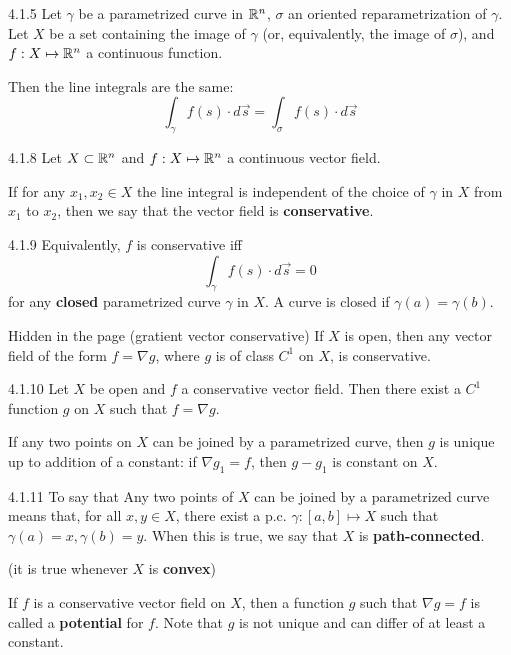 \begin{proposition}{4.1.5}
    Let $\gamma$ be a parametrized curve in $\mathbb{R}^n$, $\sigma$ an oriented reparametrization of $\gamma$.
    Let $X$ be a set containing the image of $\gamma$ (or, equivalently, the image of $\sigma$),
    and $f: X \mapsto \mathbb{R}^n$ a continuous function.

    Then the line integrals are the same:
    \[ \int_\gamma f(s) \cdot d \vec{s} = \int_\sigma f(s) \cdot d \vec{s} \]
\end{proposition}

\begin{definition}{4.1.8}
    Let $X \subset \mathbb{R}^n$ and $f: X \mapsto \mathbb{R}^n$ a continuous vector field.

    If for any $x_1, x_2 \in X$ the line integral is independent of the choice of $\gamma$ in $X$ from $x_1$ to $x_2$,
    then we say that the vector field is \textbf{conservative}.
\end{definition}

\begin{remark}{4.1.9}
    Equivalently, $f$ is conservative iff
    \[ \int_\gamma f(s) \cdot d\vec{s} = 0 \]
    for any \textbf{closed} parametrized curve $\gamma$ in $X$.
    A curve is closed if $\gamma(a) = \gamma(b)$.
\end{remark}

\begin{theorem}{Hidden in the page (gratient vector conservative)}
    If $X$ is open, then any vector field of the form $f = \nabla g$, where $g$ is of class $C^1$ on $X$, is conservative.
\end{theorem}

\begin{theorem}{4.1.10}
    Let $X$ be open and $f$ a conservative vector field.
    Then there exist a $C^1$ function $g$ on $X$ such that $f = \nabla g$.

    If any two points on $X$ can be joined by a parametrized curve, then $g$ is unique up to addition of a constant:
    if $\nabla g_1 = f$, then $g - g_1$ is constant on $X$.
\end{theorem}

\begin{remark}{4.1.11}
    To say that Any two points of $X$ can be joined by a parametrized curve means that,
    for all $x,y \in X$, there exist a p.c. $\gamma: [a,b] \mapsto X$ such that $\gamma(a) = x, \gamma(b) = y$.
    When this is true, we say that $X$ is \textbf{path-connected}.

    (it is true whenever $X$ is \textbf{convex})

    If $f$ is a conservative vector field on $X$, then a function $g$ such that $\nabla g = f$ is called a \textbf{potential} for $f$.
    Note that $g$ is not unique and can differ of at least a constant.
\end{remark}

